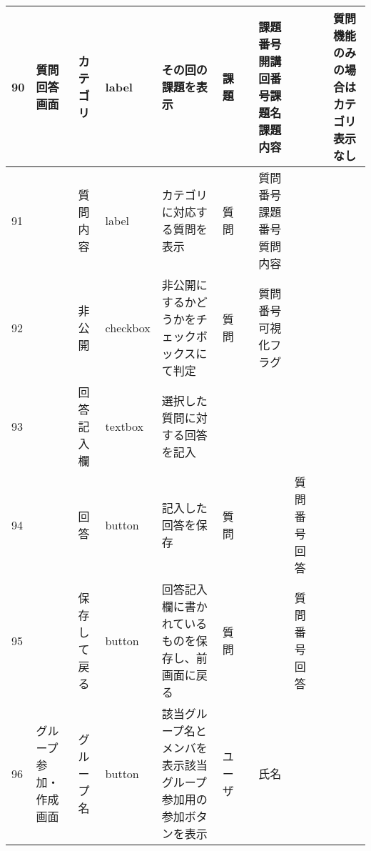 \begin{landscape}
\newpage
\begin{table}[]
\centering
\begin{tabular}{|l|l|l|l|l|l|l|l|l|l|l|}
\hline
90  & 質問回答画面        & カテゴリ             & label    & その回の課題を表示                                                         & 課題      &                       & 課題番号開講回番号課題名課題内容   &                 &                               & 質問機能のみの場合はカテゴリ表示なし                                             \\ \hline
91  &               & 質問内容             & label    & カテゴリに対応する質問を表示                                                    & 質問      &                       & 質問番号課題番号質問内容       &                 &                               &                                                                \\ \hline
92  &               & 非公開              & checkbox & 非公開にするかどうかをチェックボックスにて判定                                           & 質問      &                       & 質問番号可視化フラグ         &                 &                               &                                                                \\ \hline
93  &               & 回答記入欄            & textbox  & 選択した質問に対する回答を記入                                                   &         &                       &                    &                 &                               &                                                                \\ \hline
94  &               & 回答               & button   & 記入した回答を保存                                                         & 質問      &                       &                    & 質問番号回答          &                               &                                                                \\ \hline
95  &               & 保存して戻る           & button   & 回答記入欄に書かれているものを保存し、前画面に戻る                                         & 質問      &                       &                    & 質問番号回答          &                               &                                                                \\ \hline
96  & グループ参加・作成画面   & グループ名            & button   & 該当グループ名とメンバを表示該当グループ参加用の参加ボタンを表示                                  & ユーザ     &                       & 氏名                 &                 &                               &                                                                \\ \hline

\end{tabular}
\end{table}
\end{landscape}
